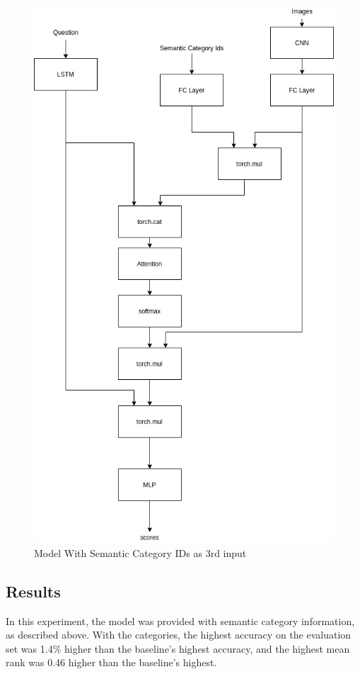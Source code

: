 \begin{figure}[h]
     \centering
     \includegraphics[width=.75\textwidth]{./figure/model_w_semantic.png}
     \caption{Model With Semantic Category IDs as 3rd input}
     \label{fig:category_model}
\end{figure}

\subsection{Results}
In this experiment, the model was provided with semantic category information, as described above.
With the categories, the highest accuracy on the evaluation set was 1.4\% higher than the baseline's highest accuracy, and the highest mean rank was 0.46 higher than the baseline's highest. 

